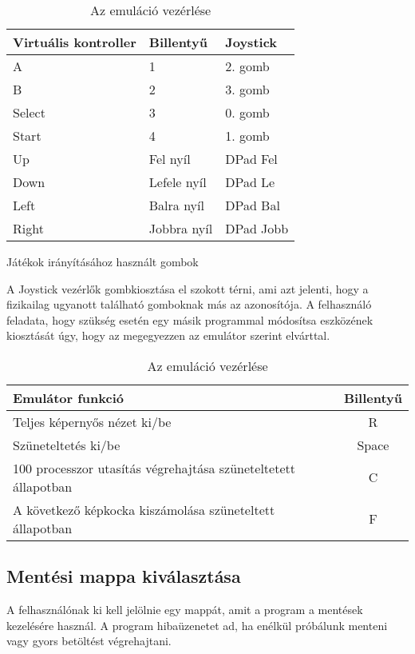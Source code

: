 \begin{table}[H]
	\centering
	\begin{tabular}{ | l |  l | l | }
		\hline
		Virtuális kontroller & Billentyű & Joystick \\
		\hline			
		A & 1 & 2. gomb \\
		B & 2 & 3. gomb \\
		Select & 3 & 0. gomb \\
		Start & 4 & 1. gomb \\
		Up    & Fel nyíl & DPad Fel \\
		Down  & Lefele nyíl & DPad Le \\
		Left  & Balra nyíl & DPad Bal \\ 
		Right & Jobbra nyíl & DPad Jobb \\
		\hline
	\end{tabular}
	\caption{Játékok irányításához használt gombok}
	
	\begin{flushleft}
		A Joystick vezérlők gombkiosztása el szokott térni, ami azt jelenti, hogy a fizikailag ugyanott található gomboknak más az azonosítója. A felhasználó feladata, hogy szükség esetén egy másik programmal módosítsa eszközének kiosztását úgy, hogy az megegyezzen az emulátor szerint elvárttal.
	\end{flushleft}
	
	\begin{tabular}{ | l | c | }
		\hline
		Emulátor funkció & Billentyű \\
		\hline			
		Teljes képernyős nézet ki/be & R \\
		Szüneteltetés ki/be & Space \\
		100 processzor utasítás végrehajtása szüneteltetett állapotban & C \\
		A következő képkocka kiszámolása szüneteltett állapotban & F \\
		\hline
	\end{tabular}
	\caption{Az emuláció vezérlése}
\end{table}


\subsection{Mentési mappa kiválasztása}

A felhasználónak ki kell jelölnie egy mappát, amit a program a mentések kezelésére használ. A program hibaüzenetet ad, ha enélkül próbálunk menteni vagy gyors betöltést végrehajtani.

